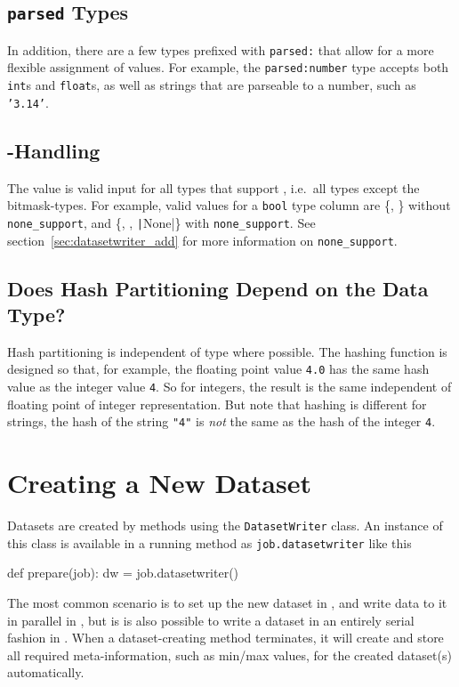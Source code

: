 \subsection{\texttt{parsed} Types}
In addition, there are a few types prefixed with \texttt{parsed:} that
allow for a more flexible assignment of values.  For example,
the \texttt{parsed:number} type accepts both \texttt{int}s
and \texttt{float}s, as well as strings that are parseable to a
number, such as \texttt{'3.14'}.



\subsection{\pyNone-Handling}
The value \pyNone is valid input for all types that support \pyNone,
i.e.\ all types except the bitmask-types.  For example, valid values
for a \texttt{bool} type column are \{\pyTrue, \pyFalse\}
without \texttt{none\_support},
and \{\pyTrue, \pyFalse, \texttt|None|\}
with \texttt{none\_support}.  See section~\ref{sec:datasetwriter_add}
for more information on \texttt{none\_support}.



\subsection{Does Hash Partitioning Depend on the Data Type?}
Hash partitioning is independent of type where possible.  The hashing
function is designed so that, for example, the floating point
value \texttt{4.0} has the same hash value as the integer
value \texttt{4}.  So for integers, the result is the same independent
of floating point of integer representation.  But note that hashing is
different for strings, the hash of the string \texttt{"4"}
is \textsl{not} the same as the hash of the integer \texttt{4}.


\section{Creating a New Dataset}
\label{sec:datasetwriter}
Datasets are created by methods using the \texttt{DatasetWriter}
class.  An instance of this class is available in a running method
as \texttt{job.datasetwriter} like this
\begin{python}
def prepare(job):
    dw = job.datasetwriter()
\end{python}

The most common scenario is to set up the new dataset in
\prepare, and write data to it in parallel in \analysis, but is is
also possible to write a dataset in an entirely serial fashion in
\synthesis.  When a dataset-creating method terminates, it will create
and store all required meta-information, such as min/max values, for
the created dataset(s) automatically.

